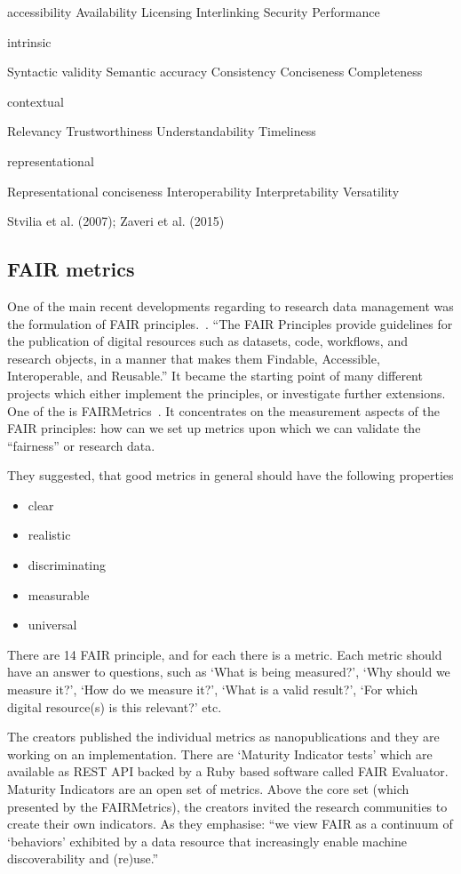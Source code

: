 accessibility
Availability
Licensing
Interlinking
Security
Performance

intrinsic

Syntactic validity
Semantic accuracy
Consistency
Conciseness
Completeness

contextual

Relevancy
Trustworthiness
Understandability
Timeliness

representational

Representational conciseness
Interoperability
Interpretability
Versatility

Stvilia et al. (2007); Zaveri et al. (2015)

\subsection{FAIR metrics}

One of the main recent developments regarding to research data management was the formulation of FAIR principles.~\cite{wilkinson2016}. ``The FAIR Principles provide guidelines for the publication of digital resources such as datasets, code, workflows, and research objects, in a manner that makes them Findable, Accessible, Interoperable, and Reusable.'' It became the starting point of many different projects which either implement the principles, or investigate further extensions. One of the is FAIRMetrics~\cite{wilkinson2018, fairmetrics}. It concentrates on the measurement aspects of the FAIR principles: how can we set up metrics upon which we can validate the ``fairness'' or research data.

They suggested, that good metrics in general should have the following properties
\begin{itemize}
 \setlength{\parskip}{0pt}
 \setlength{\itemsep}{0pt plus 1pt}
 \item clear
 \item realistic
 \item discriminating
 \item measurable
 \item universal
\end{itemize}

There are 14 FAIR principle, and for each there is a metric. Each metric should have an answer to questions, such as `What is being measured?', `Why should we measure it?', `How do we measure it?', `What is a valid result?', `For which digital resource(s) is this relevant?' etc.

The creators published the individual metrics as nanopublications and they are working on an implementation. There are `Maturity Indicator tests' which are available as REST API backed by a Ruby based software called FAIR Evaluator. Maturity Indicators are an open set of metrics. Above the core set (which presented by the FAIRMetrics), the creators invited the research communities to create their own indicators. As they emphasise: ``we view FAIR as a continuum of `behaviors' exhibited by a data resource that increasingly enable machine discoverability and (re)use.''

